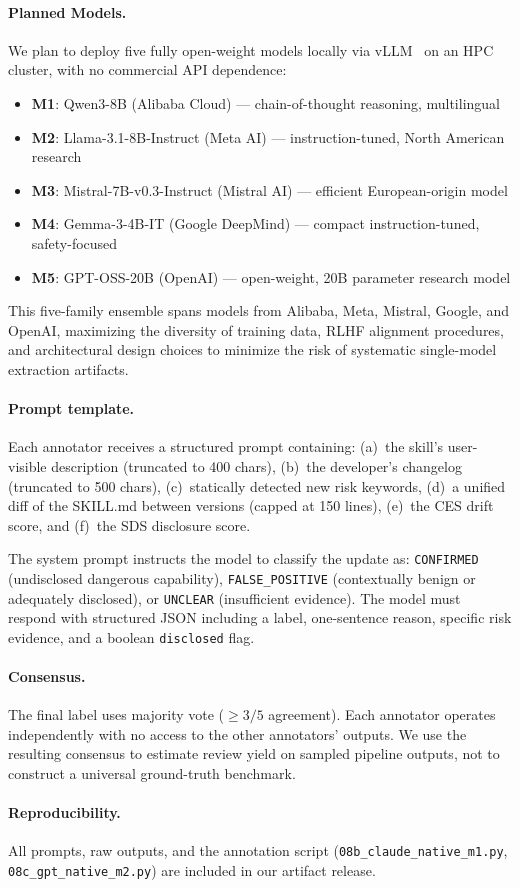 \paragraph{Planned Models.}
We plan to deploy five fully open-weight models locally via vLLM~\cite{kwon2023vllm}
on an HPC cluster, with no commercial API dependence:
\begin{itemize}[topsep=2pt,itemsep=1pt]
\item \textbf{M1}: Qwen3-8B (Alibaba Cloud) --- chain-of-thought reasoning, multilingual
\item \textbf{M2}: Llama-3.1-8B-Instruct (Meta AI) --- instruction-tuned, North American research
\item \textbf{M3}: Mistral-7B-v0.3-Instruct (Mistral AI) --- efficient European-origin model
\item \textbf{M4}: Gemma-3-4B-IT (Google DeepMind) --- compact instruction-tuned, safety-focused
\item \textbf{M5}: GPT-OSS-20B (OpenAI) --- open-weight, 20B parameter research model
\end{itemize}

This five-family ensemble spans models from Alibaba, Meta, Mistral, Google, and OpenAI,
maximizing the diversity of training data, RLHF alignment procedures, and architectural
design choices to minimize the risk of systematic single-model extraction artifacts.

\paragraph{Prompt template.}
Each annotator receives a structured prompt containing:
(a)~the skill's user-visible description (truncated to 400 chars),
(b)~the developer's changelog (truncated to 500 chars),
(c)~statically detected new risk keywords,
(d)~a unified diff of the SKILL.md between versions (capped at 150 lines),
(e)~the CES drift score, and
(f)~the SDS disclosure score.

The system prompt instructs the model to classify the update as:
\texttt{CONFIRMED} (undisclosed dangerous capability),
\texttt{FALSE\_POSITIVE} (contextually benign or adequately disclosed), or
\texttt{UNCLEAR} (insufficient evidence).
The model must respond with structured JSON including a label,
one-sentence reason, specific risk evidence, and a boolean
\texttt{disclosed} flag.

\paragraph{Consensus.}
The final label uses majority vote ($\geq3/5$ agreement).
Each annotator operates independently with no access to
the other annotators' outputs.
We use the resulting consensus
to estimate review yield on sampled pipeline outputs, not to
construct a universal ground-truth benchmark.

\paragraph{Reproducibility.}
All prompts, raw outputs, and the annotation script
(\texttt{08b\_claude\_native\_m1.py}, \texttt{08c\_gpt\_native\_m2.py})
are included in our artifact release.
